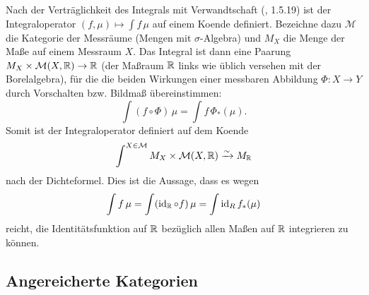 \begin{bsp}
  Nach der Verträglichkeit des Integrals mit Verwandtschaft
  (\cite{AN3}, 1.5.19) ist der Integraloperator $(f, \mu) \mapsto \int
  f \, \mu$ auf einem Koende definiert. Bezeichne dazu $\mathcal{M}$
  die Kategorie der Messräume (Mengen mit $\sigma$-Algebra) und $M_X$
  die Menge der Maße auf einem Messraum $X$. Das Integral ist dann
  eine Paarung $M_X \times \mathcal{M}(X, \mathbb{R}) \to \mathbb{R}$ (der Maßraum
  $\mathbb{R}$ links wie üblich versehen mit der Borelalgebra), für die die
  beiden Wirkungen einer messbaren Abbildung $\Phi: X \to Y$ durch
  Vorschalten bzw. Bildmaß übereinstimmen:
  \[ \int (f \circ \Phi) \, \mu = \int f \, \Phi_*(\mu). \]
  Somit ist der Integraloperator definiert auf dem Koende
  \[ \int^{X \in \mathcal{M}} M_X \times \mathcal{M}(X, \mathbb{R}) \xrightarrow[]{\sim} M_{\mathbb{R}} \]
  nach der Dichteformel. Dies ist die Aussage, dass es wegen
  \[ \int f \, \mu = \int (\operatorname{id}_{\mathbb{R}} \circ f) \, \mu = \int \operatorname{id}_R f_*(\mu) \]
  reicht, die Identitätsfunktion auf $\mathbb{R}$ bezüglich allen Maßen auf
  $\mathbb{R}$ integrieren zu können.
\end{bsp}

\subsection{Angereicherte Kategorien}

